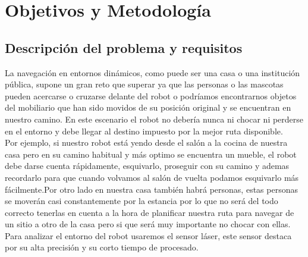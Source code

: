 \chapter{Objetivos y Metodología}
\label{cap:objetivos}


\section{Descripción del problema y requisitos}
\label{sec:descripciondelproblema}

La navegación en entornos dinámicos, como puede ser una casa o una institución pública, supone un gran reto que superar ya que las personas o las mascotas pueden acercarse o cruzarse delante del robot o podríamos encontrarnos objetos del mobiliario que han sido movidos de su posición original y se encuentran en nuestro camino. En este escenario el robot no debería nunca ni chocar ni perderse en el entorno y debe llegar al destino impuesto por la mejor ruta disponible.\\

Por ejemplo, si nuestro robot está yendo desde el salón a la cocina de nuestra casa pero en su camino habitual y más optimo se encuentra un mueble, el robot debe darse cuenta rápidamente, esquivarlo, proseguir con su camino y ademas recordarlo para que cuando volvamos al salón de vuelta podamos esquivarlo más fácilmente.Por otro lado en nuestra casa también habrá personas, estas personas se moverán casi constantemente por la estancia por lo que no será del todo correcto tenerlas en cuenta a la hora de planificar nuestra ruta para navegar de un sitio a otro de la casa pero si que será muy importante no chocar con ellas.\\

Para analizar el entorno del robot usaremos el sensor láser, este sensor destaca por su alta precisión y su corto tiempo de procesado.\\

